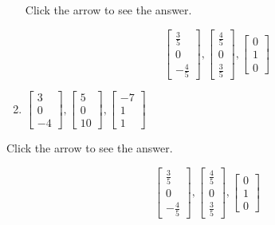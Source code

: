\documentclass{ximera}
\begin{document}
\begin{problem}
\begin{enumerate}
Click the arrow to see the answer.
\begin{expandable}
\[
\left[
\begin{array}{c}
\frac{3}{5} \\
0 \\
-\frac{4}{5}
\end{array}
\right] ,\left[
\begin{array}{c}
\frac{4}{5} \\
0 \\
\frac{3}{5}
\end{array}
\right] ,\left[
\begin{array}{c}
0 \\
1 \\
0
\end{array}
\right]
\]
\end{expandable}

\item $\left[
\begin{array}{r}
 3 \\
0 \\
-4
\end{array}
\right] ,\left[
\begin{array}{r}
 5 \\
0 \\
10
\end{array}
\right] ,\left[
\begin{array}{r}
-7 \\
1 \\
1
\end{array}
\right] $
\end{enumerate}

Click the arrow to see the answer.
\begin{expandable}
\[
\left[
\begin{array}{c}
\frac{3}{5} \\
0 \\
-\frac{4}{5}
\end{array}
\right] ,\left[
\begin{array}{c}
\frac{4}{5} \\
0 \\
\frac{3}{5}
\end{array}
\right] ,\left[
\begin{array}{c}
0 \\
1 \\
0
\end{array}
\right]
\]
\end{expandable}
\end{problem}
\end{document}
